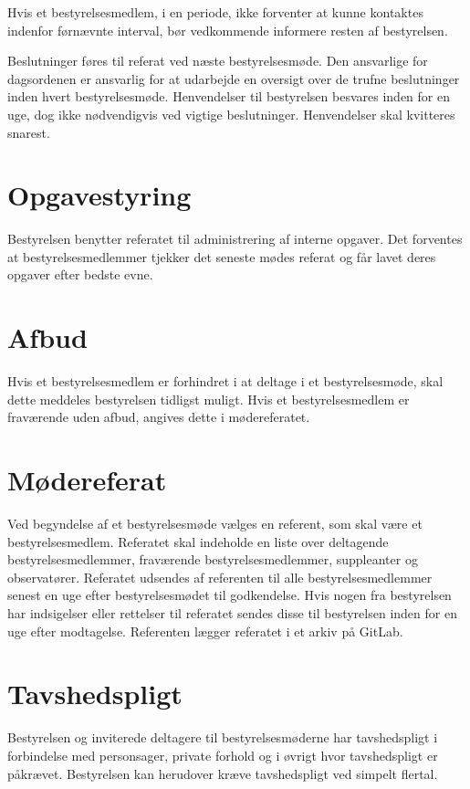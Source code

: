 Hvis et bestyrelsesmedlem, i en periode, ikke forventer at kunne kontaktes indenfor førnævnte interval, 
bør vedkommende informere resten af bestyrelsen.

Beslutninger føres til referat ved næste bestyrelsesmøde. Den ansvarlige for dagsordenen er ansvarlig 
for at udarbejde en oversigt over de trufne beslutninger inden hvert bestyrelsesmøde. Henvendelser til 
bestyrelsen besvares inden for en uge, dog ikke nødvendigvis ved vigtige beslutninger. Henvendelser skal 
kvitteres snarest.

\section{Opgavestyring}
Bestyrelsen benytter referatet til administrering af interne opgaver. Det forventes at bestyrelsesmedlemmer 
tjekker det seneste mødes referat og får lavet deres opgaver efter bedste evne.

\section{Afbud}
Hvis et bestyrelsesmedlem er forhindret i at deltage i et bestyrelsesmøde, skal dette meddeles bestyrelsen 
tidligst muligt. Hvis et bestyrelsesmedlem er fraværende uden afbud, angives dette i mødereferatet.

\section{Mødereferat}
Ved begyndelse af et bestyrelsesmøde vælges en referent, som skal være et bestyrelsesmedlem. Referatet skal 
indeholde en liste over deltagende bestyrelsesmedlemmer, fraværende bestyrelsesmedlemmer, suppleanter og 
observatører. Referatet udsendes af referenten til alle bestyrelsesmedlemmer senest en uge efter 
bestyrelsesmødet til godkendelse. Hvis nogen fra bestyrelsen har indsigelser eller rettelser til referatet 
sendes disse til bestyrelsen inden for en uge efter modtagelse. Referenten lægger referatet i et arkiv på 
GitLab.

\section{Tavshedspligt}
Bestyrelsen og inviterede deltagere til bestyrelsesmøderne har tavshedspligt i forbindelse med personsager, 
private forhold og i øvrigt hvor tavshedspligt er påkrævet. Bestyrelsen kan herudover kræve tavshedspligt 
ved simpelt flertal.

